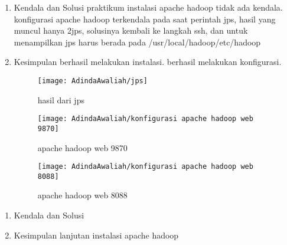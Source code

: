 
\begin{enumerate}
\item Kendala dan Solusi
\newline praktikum instalasi apache hadoop tidak ada kendala. konfigurasi apache hadoop terkendala pada saat perintah jps, hasil yang muncul hanya 2jps, solusinya kembali ke langkah ssh, dan untuk menampilkan jps harus berada pada /usr/local/hadoop/etc/hadoop

\item Kesimpulan
\newline berhasil melakukan instalasi. berhasil melakukan konfigurasi.

\begin{figure}[!ht]
\texttt{[image: AdindaAwaliah/jps]}
\caption{hasil dari jps}
\label{gam:jps}
\end{figure}

\begin{figure}
\texttt{[image: AdindaAwaliah/konfigurasi apache hadoop web 9870]}
\caption{apache hadoop web 9870}
\label{gam:konfigurasi apache hadoop web 9870}
\end{figure}

\begin{figure}
\texttt{[image: AdindaAwaliah/konfigurasi apache hadoop web 8088]}
\caption{apache hadoop web 8088}
\label{gam:konfigurasi apache hadoop web 8088}
\end{figure}

\end{enumerate}

\begin{enumerate}
\item Kendala dan Solusi

\item Kesimpulan
\newline lanjutan instalasi apache hadoop

\end{enumerate}


